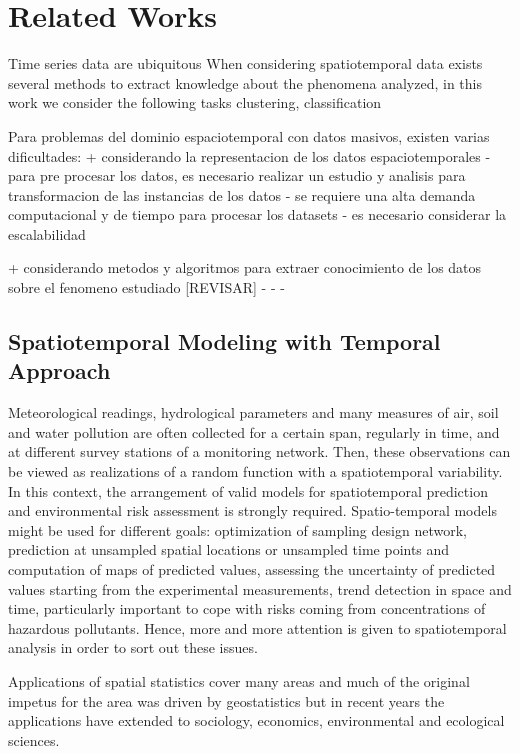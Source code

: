 \chapter{Related Works}
\label{chapter_Related_Works}

Time series data are ubiquitous  
When considering spatiotemporal data exists several methods to extract knowledge about the phenomena analyzed, in this work we consider the following tasks clustering, classification

Para problemas del dominio espaciotemporal con datos masivos, existen varias dificultades: 
+ considerando la representacion de los datos espaciotemporales
	- para pre procesar los datos, es necesario realizar un estudio y analisis para transformacion de las instancias de los datos
	- se requiere una alta demanda computacional y de tiempo para procesar los datasets
	- es necesario considerar la escalabilidad 

+ considerando metodos y algoritmos para extraer conocimiento de los datos sobre el fenomeno estudiado [REVISAR]
	- 
	- 
	-

\section{Spatiotemporal Modeling with Temporal Approach}
\label{Sec:SPT-Temporal}

Meteorological readings, hydrological parameters and many measures of air, soil and water pollution are often collected for a certain span, regularly in time, and at different survey stations of a monitoring network. Then, these observations can be viewed as realizations of a random function with a spatiotemporal variability. In this context, the arrangement of valid models for spatiotemporal prediction and environmental risk assessment is strongly required. Spatio-temporal models might be used for different goals: optimization of sampling design network, prediction at unsampled spatial locations or unsampled time points and computation of maps of predicted values, assessing the uncertainty of predicted values starting from the experimental measurements, trend detection in space and time, particularly important to cope with risks coming from concentrations of hazardous pollutants. Hence, more and more attention is given to spatiotemporal analysis in order to sort out these issues.

Applications of spatial statistics cover many areas and much of the original impetus for the area was driven by geostatistics but in recent years the applications have extended to sociology, economics, environmental and ecological sciences.




